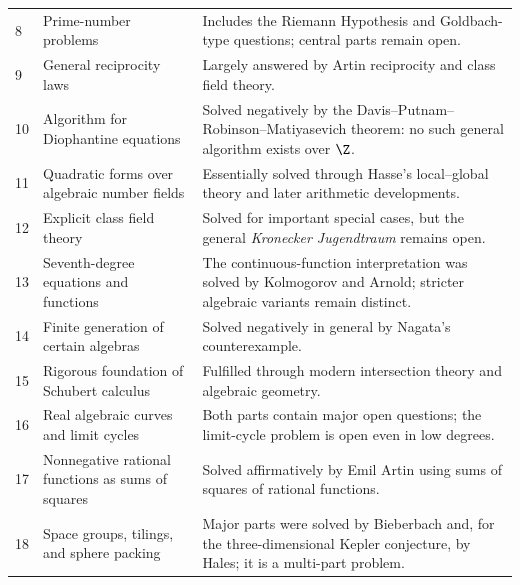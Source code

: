 {\begin{longtable}{@{}L{0.06\textwidth}L{0.31\textwidth}L{0.55\textwidth}@{}}
        8
        & Prime-number problems
        & Includes the Riemann Hypothesis and Goldbach-type questions; central
          parts remain open. \\

        9
        & General reciprocity laws
        & Largely answered by Artin reciprocity and class field theory. \\

        10
        & Algorithm for Diophantine equations
        & Solved negatively by the Davis--Putnam--Robinson--Matiyasevich
          theorem: no such general algorithm exists over $\Z$. \\

        11
        & Quadratic forms over algebraic number fields
        & Essentially solved through Hasse's local--global theory and later
          arithmetic developments. \\

        12
        & Explicit class field theory
        & Solved for important special cases, but the general
          \emph{Kronecker Jugendtraum} remains open. \\

        13
        & Seventh-degree equations and functions
        & The continuous-function interpretation was solved by Kolmogorov and
          Arnold; stricter algebraic variants remain distinct. \\

        14
        & Finite generation of certain algebras
        & Solved negatively in general by Nagata's counterexample. \\

        15
        & Rigorous foundation of Schubert calculus
        & Fulfilled through modern intersection theory and algebraic geometry. \\

        16
        & Real algebraic curves and limit cycles
        & Both parts contain major open questions; the limit-cycle problem is
          open even in low degrees. \\

        17
        & Nonnegative rational functions as sums of squares
        & Solved affirmatively by Emil Artin using sums of squares of rational
          functions. \\

        18
        & Space groups, tilings, and sphere packing
        & Major parts were solved by Bieberbach and, for the three-dimensional
          Kepler conjecture, by Hales; it is a multi-part problem. \\


\end{longtable}}
